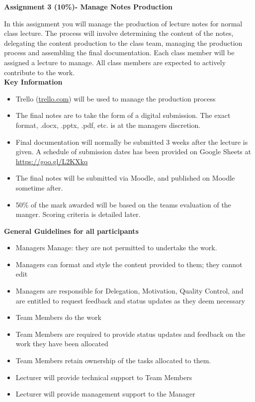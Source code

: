 
	
\begin{flushleft}
\Large\textbf{Assignment 3 (10\%)- Manage Notes Production}\\
\end{flushleft}

In this assignment you will manage the production of lecture notes for normal class lecture.  The process will involve determining the content of the notes, delegating the content production to the class team, managing the production process and assembling the final documentation.  Each class member will be assigned a lecture to manage.  All class members are expected to actively contribute to the work.\\

\textbf{Key Information}\\

\begin{itemize}
	\item Trello (\href{trello.com}{trello.com}) will be used to manage the production process
	\item The final notes are to take the form of a digital submission.  The exact format, .docx, .pptx, .pdf, etc. is at the managers discretion. 
	\item Final documentation will normally be submitted 3 weeks after the lecture is given.  A schedule of submission dates has been provided on Google Sheets at \href{https://goo.gl/L2KXkq}{https://goo.gl/L2KXkq}
	\item The final notes will be submitted via Moodle, and published on Moodle sometime after.
	\item 50\% of the mark awarded will be based on the teams evaluation of the manger.  Scoring criteria is detailed later.
\end{itemize}

\textbf{General Guidelines for all participants}\\

\begin{itemize}
	\item Managers Manage: they are not permitted to undertake the work.
	\item Managers can format and style the content provided to them; they cannot edit
	\item Managers are responsible for Delegation, Motivation, Quality Control, and are entitled to request feedback and status updates as they deem necessary
	\item Team Members do the work
	\item Team Members are required to provide status updates and feedback on the work they have been allocated
	\item Team Members retain ownership of the tasks allocated to them. 
	\item Lecturer will provide technical support to Team Members
	\item Lecturer will provide management support to the Manager
\end{itemize}

